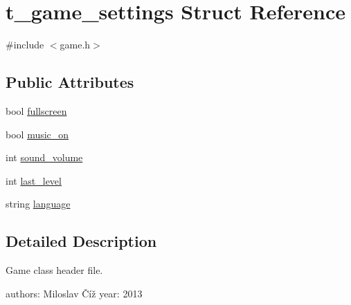 \hypertarget{structt__game__settings}{\section{t\-\_\-game\-\_\-settings Struct Reference}
\label{structt__game__settings}
}


{\ttfamily \#include $<$game.\-h$>$}

\subsection*{Public Attributes}
\begin{DoxyCompactItemize}
\item 
bool \hyperlink{structt__game__settings_a33b533777d6fb82b3f8def6e26229597}{fullscreen}
\item 
bool \hyperlink{structt__game__settings_a3b1f22415c52a3b76d81cbd778b477bb}{music\-\_\-on}
\item 
int \hyperlink{structt__game__settings_a061c2e5b8aa3fcb84ffbce21025478e1}{sound\-\_\-volume}
\item 
int \hyperlink{structt__game__settings_aac810d731f668517630b182102e9fa7c}{last\-\_\-level}
\item 
string \hyperlink{structt__game__settings_a6b63568079b14532ae4acd05ba8488ff}{language}
\end{DoxyCompactItemize}


\subsection{Detailed Description}
Game class header file.

authors\-: Miloslav Číž year\-: 2013 

